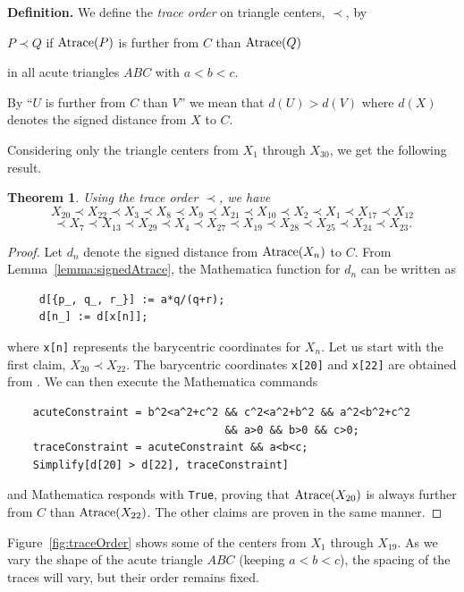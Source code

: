 \documentclass[12pt,a4paper]{amsart}
\newtheorem{theorem}{Theorem} [section]
\begin{document}
\newpage

\textbf{Definition.}
We define the \emph{trace order} on triangle centers, $\prec$, by

\centerline{$P\prec Q$ if $\hbox{Atrace}(P)$ is further from $C$ than $\hbox{Atrace}(Q)$ }
\centerline{in all acute triangles $ABC$ with $a<b<c$.}

By ``$U$ is further from $C$ than $V$'' we mean that $d(U)>d(V)$
where $d(X)$ denotes the signed distance from $X$ to $C$.

Considering only the triangle centers from $X_1$ through $X_{30}$, we get the following result.

\begin{theorem}
\label{thm:acuteTrace}
Using the trace order $\prec$, we have
$$X_{20}\prec X_{22}\prec  X_3\prec X_{8}\prec  X_9 \prec X_{21}\prec X_{10}\prec  X_2\prec X_1\prec X_{17}\prec X_{12}$$
$$\prec  X_7\prec X_{13}\prec X_{29}\prec X_4\prec X_{27}\prec X_{19}\prec X_{28}\prec X_{25}\prec X_{24}\prec X_{23}.$$
\end{theorem}

\begin{proof}
Let $d_n$ denote the signed distance from $\hbox{Atrace}(X_n)$ to $C$.
From Lemma~\ref{lemma:signedAtrace}, the Mathematica function for $d_n$ can be written as
\begin{verbatim}
     d[{p_, q_, r_}] := a*q/(q+r);
     d[n_] := d[x[n]];
\end{verbatim}
where \texttt{x[n]} represents the barycentric coordinates for $X_n$.
Let us start with the first claim, $X_{20}\prec  X_{22}$.
The barycentric coordinates \texttt{x[20]} and \texttt{x[22]} are obtained from \cite{ETC}.
We can then execute the Mathematica commands
\begin{verbatim}
    acuteConstraint = b^2<a^2+c^2 && c^2<a^2+b^2 && a^2<b^2+c^2
                                  && a>0 && b>0 && c>0;
    traceConstraint = acuteConstraint && a<b<c;
    Simplify[d[20] > d[22], traceConstraint]
\end{verbatim}
and Mathematica responds with \texttt{True}, proving that $\hbox{Atrace}(X_{20})$
is always further from $C$ than $\hbox{Atrace}(X_{22})$.
The other claims are proven in the same manner.
\end{proof}

Figure~\ref{fig:traceOrder} shows some of the centers from $X_1$ through $X_{19}$. As we vary the shape of the acute triangle $ABC$ (keeping $a<b<c$),
the spacing of the traces will vary, but their order remains fixed.
\end{document}
